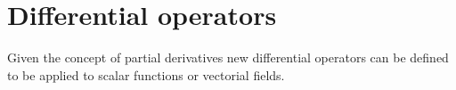 \chapter{Differential operators}
Given the concept of partial derivatives new differential operators can be defined to be applied to scalar functions or vectorial fields.
